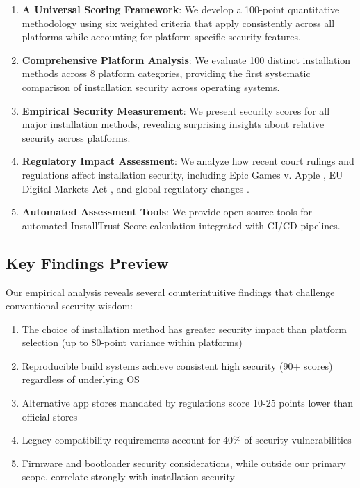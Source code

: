 \documentclass[11pt,a4paper]{article}
\begin{document}
\begin{enumerate}
    \item \textbf{A Universal Scoring Framework}: We develop a 100-point quantitative methodology using six weighted criteria that apply consistently across all platforms while accounting for platform-specific security features.
    
    \item \textbf{Comprehensive Platform Analysis}: We evaluate 100 distinct installation methods across 8 platform categories, providing the first systematic comparison of installation security across operating systems.
    
    \item \textbf{Empirical Security Measurement}: We present security scores for all major installation methods, revealing surprising insights about relative security across platforms.
    
    \item \textbf{Regulatory Impact Assessment}: We analyze how recent court rulings and regulations affect installation security, including Epic Games v. Apple \cite{epic2021ruling,epic2024appeal}, EU Digital Markets Act \cite{eu2024dma}, and global regulatory changes \cite{japan2024appstore,korea2021appstore,uk2024cma,india2024antitrust}.
    
    \item \textbf{Automated Assessment Tools}: We provide open-source tools for automated InstallTrust Score calculation integrated with CI/CD pipelines.
\end{enumerate}

\subsection{Key Findings Preview}

Our empirical analysis reveals several counterintuitive findings that challenge conventional security wisdom:

\begin{enumerate}
    \item The choice of installation method has greater security impact than platform selection (up to 80-point variance within platforms)
    \item Reproducible build systems achieve consistent high security (90+ scores) regardless of underlying OS
    \item Alternative app stores mandated by regulations score 10-25 points lower than official stores
    \item Legacy compatibility requirements account for 40\% of security vulnerabilities
    \item Firmware and bootloader security considerations, while outside our primary scope, correlate strongly with installation security
\end{enumerate}
\end{document}
